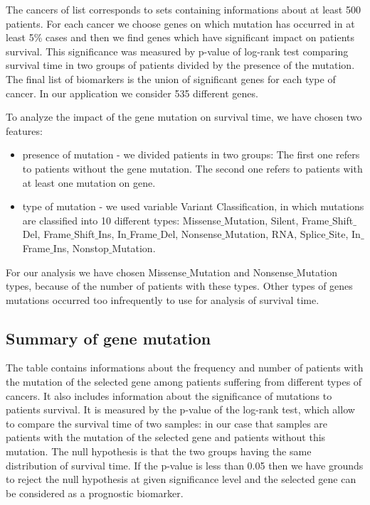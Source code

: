 The cancers of list corresponds to sets containing informations about at
least 500 patients. For each cancer we choose genes on which mutation
has occurred in at least 5\% cases and then we find genes which have
significant impact on patients survival. This significance was measured
by p-value of log-rank test comparing survival time in two groups of
patients divided by the presence of the mutation. The final list of
biomarkers is the union of significant genes for each type of cancer. In
our application we consider 535 different genes.

To analyze the impact of the gene mutation on survival time, we have
chosen two features:

\begin{itemize}
\tightlist
\item
  presence of mutation - we divided patients in two groups: The first
  one refers to patients without the gene mutation. The second one
  refers to patients with at least one mutation on gene.
\item
  type of mutation - we used variable Variant Classification, in which
  mutations are classified into 10 different types:
  Missense\(\_\)Mutation, Silent, Frame\(\_\)Shift\(\_\)Del,
  Frame\(\_\)Shift\(\_\)Ins, In\(\_\)Frame\(\_\)Del,
  Nonsense\(\_\)Mutation, RNA, Splice\(\_\)Site, In\(\_\)Frame\(\_\)Ins,
  Nonstop\(\_\)Mutation.
\end{itemize}

For our analysis we have chosen Missense\(\_\)Mutation and
Nonsense\(\_\)Mutation types, because of the number of patients with
these types. Other types of genes mutations occurred too infrequently to
use for analysis of survival time.

\subsection{Summary of gene mutation}\label{summary-of-gene-mutation}

The table contains informations about the frequency and number of
patients with the mutation of the selected gene among patients suffering
from different types of cancers. It also includes information about the
significance of mutations to patients survival. It is measured by the
p-value of the log-rank test, which allow to compare the survival time
of two samples: in our case that samples are patients with the mutation
of the selected gene and patients without this mutation. The null
hypothesis is that the two groups having the same distribution of
survival time. If the p-value is less than 0.05 then we have grounds to
reject the null hypothesis at given significance level and the selected
gene can be considered as a prognostic biomarker.

